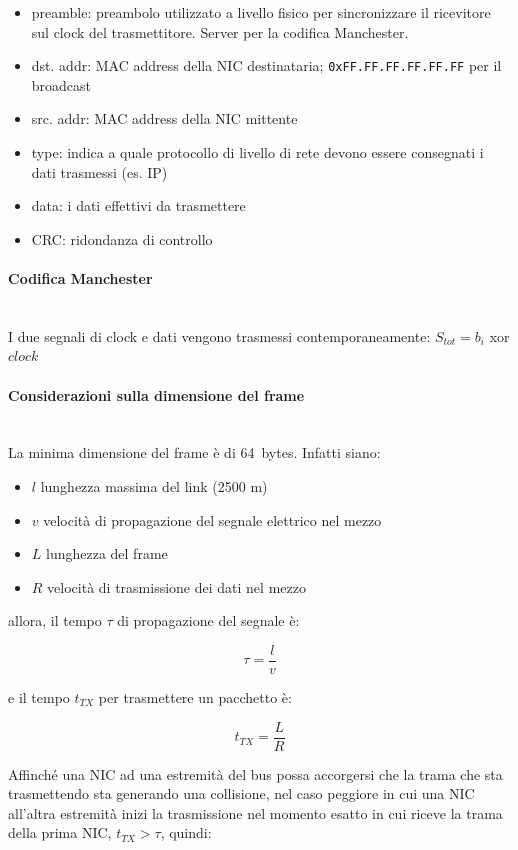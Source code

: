 \documentclass[12pt,a4paper]{article}
\begin{document}
\begin{itemize}
  \item preamble: preambolo utilizzato a livello fisico per sincronizzare
    il ricevitore sul clock del trasmettitore. Server per la codifica Manchester.
  \item dst. addr: MAC address della NIC destinataria; \texttt{0xFF.FF.FF.FF.FF.FF}
    per il broadcast
  \item src. addr: MAC address della NIC mittente
  \item type: indica a quale protocollo di livello di rete devono essere
    consegnati i dati trasmessi (es. IP)
  \item data: i dati effettivi da trasmettere
  \item CRC: ridondanza di controllo
\end{itemize}

\paragraph{Codifica Manchester}\mbox{}\\
I due segnali di clock e dati vengono trasmessi contemporaneamente:
$S_{tot} = b_{i}$ xor $clock$

\paragraph{Considerazioni sulla dimensione del frame}\mbox{}\\
La minima dimensione del frame è di 64~bytes. Infatti siano:

\begin{itemize}
  \item $l$ lunghezza massima del link (2500 m)
  \item $v$ velocità di propagazione del segnale elettrico nel mezzo
  \item $L$ lunghezza del frame
  \item $R$ velocità di trasmissione dei dati nel mezzo
\end{itemize}

allora, il tempo $\tau $ di propagazione del segnale è:

$$ \tau = \frac{l}{v} $$

e il tempo $ t_{TX} $ per trasmettere un pacchetto è:

$$ t_{TX} = \frac{L}{R} $$

Affinché una NIC ad una estremità del bus possa accorgersi che la trama
che sta trasmettendo sta generando una collisione, nel caso peggiore in
cui una NIC all'altra estremità inizi la trasmissione nel momento esatto
in cui riceve la trama della prima NIC, $ t_{TX} > \tau $, quindi:
\end{document}
